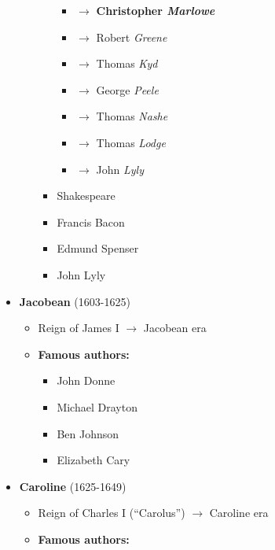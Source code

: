 \documentclass[
  12pt,
    progressbar=frametitle]{beamer}
\providecommand{\tightlist}{%
  \setlength{\itemsep}{0pt}\setlength{\parskip}{0pt}}
\begin{document}
\begin{frame}[allowframebreaks]
\begin{itemize}
\begin{itemize}
\begin{itemize}
      \begin{itemize}
      \tightlist
      \item
        \footnotesize{}\;\normalsize \(\rightarrow\)
        \textbf{Christopher \emph{Marlowe}}
      \item
        \footnotesize{}\;\normalsize \(\rightarrow\)
        Robert \emph{Greene}
      \item
        \footnotesize{}\;\normalsize \(\rightarrow\)
        Thomas \emph{Kyd}
      \item
        \footnotesize{}\;\normalsize \(\rightarrow\)
        George \emph{Peele}
      \item
        \footnotesize{}\;\normalsize \(\rightarrow\)
        Thomas \emph{Nashe}
      \item
        \footnotesize{}\;\normalsize \(\rightarrow\) Thomas
        \emph{Lodge}
      \item
        \footnotesize{}\;\normalsize \(\rightarrow\) John
        \emph{Lyly}
      \end{itemize}
    \item
      Shakespeare
    \item
      Francis Bacon
    \item
      Edmund Spenser
    \item
      John Lyly
    \end{itemize}
  \end{itemize}
\item
  \textbf{Jacobean} (1603-1625)

  \begin{itemize}
  \tightlist
  \item
    Reign of James I \(\rightarrow\) Jacobean era
  \item
    \textbf{Famous authors:}

    \begin{itemize}
    \tightlist
    \item
      John Donne
    \item
      Michael Drayton
    \item
      Ben Johnson
    \item
      Elizabeth Cary
    \end{itemize}
  \end{itemize}
\item
  \textbf{Caroline} (1625-1649)

  \begin{itemize}
  \tightlist
  \item
    Reign of Charles I (``Carolus'') \(\rightarrow\) Caroline era
  \item
    \textbf{Famous authors:}


\end{itemize}
\end{itemize}
\end{frame}
\end{document}

